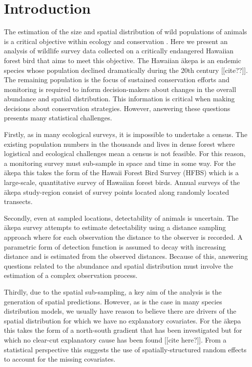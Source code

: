 \documentclass[preprint,12pt]{elsarticle}
\newcommand{\akepa}{\textquotesingle\={a}kepa}  %
\begin{document}
\section{Introduction}

The estimation of the size and spatial distribution of wild populations of animals is a critical objective within ecology and conservation \citep{schwarz_estimating_1999}. Here we present an analysis of wildlife survey data collected on a critically endangered Hawaiian forest bird that aims to meet this objective.  The Hawaiian \akepa{} is an endemic species whose population declined dramatically during the 20th century [[cite??]].  The remaining population is the focus of sustained conservation efforts and monitoring is required to inform decision-makers about changes in the overall abundance and spatial distribution.  This information is critical when making decisions about conservation strategies.  However, answering these questions presents many statistical challenges.  

Firstly, as in many ecological surveys, it is impossible to undertake a census.  The existing population numbers in the thousands and lives in dense forest where logistical and ecological challenges mean a census is not feasible.  For this reason, a monitoring survey must sub-sample in space and time in some way.  For the \akepa{} this takes the form of the Hawaii Forest Bird Survey (HFBS) \citep{scott_HFBS_1986} which is a large-scale, quantitative survey of Hawaiian forest birds.  Annual surveys of the \akepa{} study-region consist of survey points located along randomly located transects.    

Secondly, even at sampled locations, detectability of animals is uncertain.  The \akepa{} survey attempts to estimate detectability using a distance sampling approach \citep{buckland_distance_2015} where for each observation the distance to the observer is recorded.  A parametric form of detection function is assumed to decay with increasing distance and is estimated from the observed distances.  Because of this, answering questions related to the abundance and spatial distribution must involve the estimation of a complex observation process.  

Thirdly, due to the spatial sub-sampling, a key aim of the analysis is the generation of spatial predictions.  However, as is the case in many species distribution models, we usually have reason to believe there are drivers of the spatial distribution for which we have no explanatory covariates.  For the \akepa{} this takes the form of a north-south gradient that has been investigated but for which no clear-cut explanatory cause has been found [[cite here?]].  From a statistical perspective this suggests the use of spatially-structured random effects to account for the missing covariates.
\end{document}
